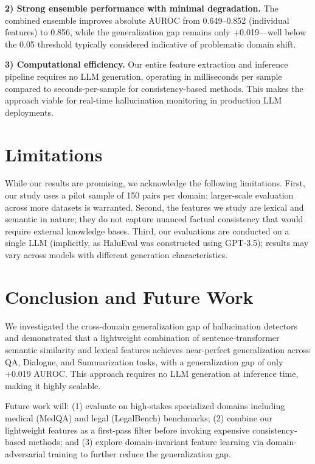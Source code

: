 \documentclass[conference]{IEEEtran}
\begin{document}
\textbf{2) Strong ensemble performance with minimal degradation.} The combined ensemble improves absolute AUROC from 0.649–0.852 (individual features) to 0.856, while the generalization gap remains only +0.019—well below the 0.05 threshold typically considered indicative of problematic domain shift.

\textbf{3) Computational efficiency.} Our entire feature extraction and inference pipeline requires no LLM generation, operating in milliseconds per sample compared to seconds-per-sample for consistency-based methods. This makes the approach viable for real-time hallucination monitoring in production LLM deployments.

\section{Limitations}

While our results are promising, we acknowledge the following limitations. First, our study uses a pilot sample of 150 pairs per domain; larger-scale evaluation across more datasets is warranted. Second, the features we study are lexical and semantic in nature; they do not capture nuanced factual consistency that would require external knowledge bases. Third, our evaluations are conducted on a single LLM (implicitly, as HaluEval was constructed using GPT-3.5); results may vary across models with different generation characteristics.

\section{Conclusion and Future Work}

We investigated the cross-domain generalization gap of hallucination detectors and demonstrated that a lightweight combination of sentence-transformer semantic similarity and lexical features achieves near-perfect generalization across QA, Dialogue, and Summarization tasks, with a generalization gap of only +0.019 AUROC. This approach requires no LLM generation at inference time, making it highly scalable.

Future work will: (1) evaluate on high-stakes specialized domains including medical (MedQA) and legal (LegalBench) benchmarks; (2) combine our lightweight features as a first-pass filter before invoking expensive consistency-based methods; and (3) explore domain-invariant feature learning via domain-adversarial training to further reduce the generalization gap.
\end{document}
